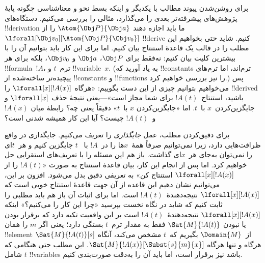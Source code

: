 \documentclass[../../../include/open-logic-section]{subfiles}
\begin{document}


برای روشن‌شدن پیوند مطالب با یکدیگر و اینکه بسط نحو و معناشناسی چگونه
پایهٔ پژوهش‌های پیشرفته‌تر بعدی را می‌گذارد، مثالی را بررسی می‌کنیم.
دستگاه‌های !!{derivation} ما باید اجازه دهند
$\Atom{\Obj P}{\Obj a}$ را از
$\lforall[\Obj v_0][\Atom{\Obj P}{\Obj v_0}]$ !!{derive} کنیم. شاید
حتی بخواهیم این مطلب را در قالب یک قاعدهٔ استنتاج بیان کنیم. اما برای
این کار باید بتوانیم آن را با بیشترین کلیت بیان کنیم: نه‌فقط برای
$\Obj P$، $\Obj a$ و $\Obj v_0$، بلکه برای هر !!{formula}~$!A$،
ترم~$t$ و !!{variable}~$x$. (به یاد آورید که !!{constant}s ترم‌اند،
اما ترم‌های پیچیده‌تر ساخته‌شده از !!{constant}s و !!{function}s را نیز
بررسی خواهیم کرد.) پس می‌خواهیم بتوانیم چیزی از این دست بگوییم:
«هرگاه $\lforall[x][!A(x)]$ را !!{derive}d باشید، استنتاج~$!A(t)$ برای
شما مجاز است»---یعنی نتیجهٔ حذف $\lforall[x]$ و جایگزین‌کردن~$x$
با~$t$. اما «جایگزین‌کردن $x$ با~$t$» دقیقاً یعنی چه؟ رابطهٔ میان
$!A(x)$ و~$!A(t)$ چیست؟ آیا این کار همیشه شدنی است؟

برای دقیق‌کردن مطلب، عمل \emph{جایگذاری} را تعریف می‌کنیم. جایگذاری در
واقع ظرافت‌هایی دارد، زیرا نمی‌توانیم صرفاً همهٔ~$x$ها را در~$!A$ با
~$t$ جایگزین کنیم و هر~$t$ای را نمی‌توان به‌جای هر~$x$ای گذاشت. باز هم
این مسئله را با تعریف‌های استقرایی حل خواهیم کرد. اما پس از انجام این
کار، بیان قاعدهٔ استنتاج به صورت «$!A(t)$ را از
$\lforall[x][!A(x)]$ استنتاج کن» به تعریفی دقیق بدل می‌شود. افزون بر
این، می‌توانیم نشان دهیم این قاعده از آن جهت قاعدهٔ استنتاج خوبی است
که $\lforall[x][!A(x)]$ نتیجه‌دهندهٔ~$!A(t)$ است. اما برای اثبات آن باز
هم باید مطلبی را ثابت کنیم که شاید در نگاه نخست بپرسید «چرا این کار را
می‌کنیم؟» اینکه $\lforall[x][!A(x)]$ نتیجه‌دهندهٔ~$!A(t)$ است بر این
واقعیت تکیه دارد که برقرار بودن یا نبودن $\Sat{M}{!A(t)}$ فقط به مقدار
ترم~$t$ بستگی دارد؛ یعنی اگر $m$ را همان !!{element} از~$\Domain{M}$
بگیریم که~$t$ مشخص می‌کند، آنگاه $\Sat{M}{!A(t)}[s]$ هرگاه و تنها
هرگاه $\Sat{M}{!A(x)}[\Subst{s}{m}{x}]$. این مطلب حتی هنگامی که $t$
شامل !!{variable}s باشد نیز برقرار است، اما باید آن را به‌دقت
صورت‌بندی کنیم.
\end{document}

